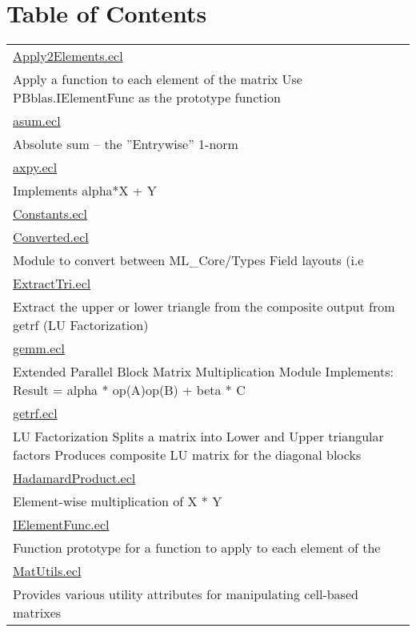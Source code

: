 \section*{Table of Contents}
{\renewcommand{\arraystretch}{1.5}
\begin{longtable}{|p{\textwidth}|}
\hline
\hyperlink{ecldoc:toc:PBblas.Apply2Elements}{Apply2Elements.ecl} \\
Apply a function to each element of the matrix Use PBblas.IElementFunc as the prototype function \\
\hline
\hyperlink{ecldoc:toc:PBblas.asum}{asum.ecl} \\
Absolute sum -- the ''Entrywise'' 1-norm \\
\hline
\hyperlink{ecldoc:toc:PBblas.axpy}{axpy.ecl} \\
Implements alpha*X + Y \\
\hline
\hyperlink{ecldoc:toc:PBblas.Constants}{Constants.ecl} \\
\hline
\hyperlink{ecldoc:toc:PBblas.Converted}{Converted.ecl} \\
Module to convert between ML\_Core/Types Field layouts (i.e \\
\hline
\hyperlink{ecldoc:toc:PBblas.ExtractTri}{ExtractTri.ecl} \\
Extract the upper or lower triangle from the composite output from getrf (LU Factorization) \\
\hline
\hyperlink{ecldoc:toc:PBblas.gemm}{gemm.ecl} \\
Extended Parallel Block Matrix Multiplication Module Implements: Result = alpha * op(A)op(B) + beta * C \\
\hline
\hyperlink{ecldoc:toc:PBblas.getrf}{getrf.ecl} \\
LU Factorization Splits a matrix into Lower and Upper triangular factors Produces composite LU matrix for the diagonal blocks \\
\hline
\hyperlink{ecldoc:toc:PBblas.HadamardProduct}{HadamardProduct.ecl} \\
Element-wise multiplication of X * Y \\
\hline
\hyperlink{ecldoc:toc:PBblas.IElementFunc}{IElementFunc.ecl} \\
Function prototype for a function to apply to each element of the \\
\hline
\hyperlink{ecldoc:toc:PBblas.MatUtils}{MatUtils.ecl} \\
Provides various utility attributes for manipulating cell-based matrixes \\
\hline

\end{longtable}}
